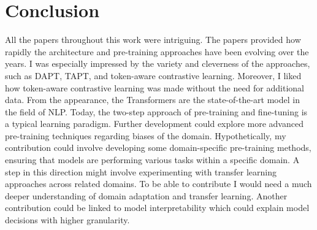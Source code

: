 \documentclass[times, utf8, seminar]{fer}
\begin{document}
\chapter{Conclusion}
All the papers throughout this work were intriguing. The papers provided how rapidly the architecture and pre-training approaches have been evolving over the years. I was especially impressed by the variety and cleverness of the approaches, such as DAPT, TAPT, and token-aware contrastive learning. Moreover, I liked how token-aware contrastive learning was made without the need for additional data. From the appearance, the Transformers are the state-of-the-art model in the field of NLP. Today, the two-step approach of pre-training and fine-tuning is a typical learning paradigm. Further development could explore more advanced pre-training techniques regarding biases of the domain. Hypothetically, my contribution could involve developing some domain-specific pre-training methods, ensuring that models are performing various tasks within a specific domain. A step in this direction might involve experimenting with transfer learning approaches across related domains. To be able to contribute I would need a much deeper understanding of domain adaptation and transfer learning. Another contribution could be linked to model interpretability which could explain model decisions with higher granularity.



\end{document}
